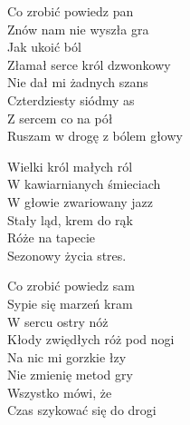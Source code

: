 \begin{text}
Co zrobić powiedz pan\\
Znów nam nie wyszła gra\\
Jak ukoić ból\\
Złamał serce król dzwonkowy\\
Nie dał mi żadnych szans\\
Czterdziesty siódmy as\\
Z sercem co na pół\\
Ruszam w drogę z bólem głowy

\vin Wielki król małych ról\\
\vin W kawiarnianych śmieciach\\
\vin W głowie zwariowany jazz\\
\vin Stały ląd, krem do rąk\\
\vin Róże na tapecie\\
\vin Sezonowy życia stres.

Co zrobić powiedz sam\\
Sypie się marzeń kram\\
W sercu ostry nóż\\
Kłody zwiędłych róż pod nogi\\
Na nic mi gorzkie łzy\\
Nie zmienię metod gry \\
Wszystko mówi, że\\
Czas szykować się do drogi 
\end{text}
